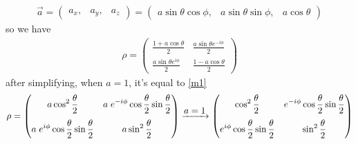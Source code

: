 \documentclass{article}
\begin{document}
\begin{align*}
    \vec{a} = 
    \begin{pmatrix}
        a_x,& a_y,& a_z 
    \end{pmatrix}
    = 
    \begin{pmatrix}
         a \sin\theta\cos\phi,& a \sin\theta\sin\phi,& a \cos\theta    
    \end{pmatrix}
\end{align*}
so we have
\begin{align*}
    \rho = \begin{pmatrix}\displaystyle \frac{1+a \cos\theta}{2}&\displaystyle \frac{a \sin\theta e^{-i\phi}}{2}\\[1em]\displaystyle \frac{a \sin\theta e^{i\phi}}{2}&\displaystyle \frac{1-a \cos\theta}{2}\end{pmatrix}
\end{align*}
after simplifying, when $a=1$, it's equal to \ref{m1}
\begin{align*}
    \rho = \begin{pmatrix}\displaystyle a \cos^2\frac{\theta}{2}&\displaystyle a \hspace{0.1cm} e^{-i\phi}\cos\frac{\theta}{2}\sin\frac{\theta}{2}\\[1em]\displaystyle a\hspace{0.1cm} e^{i\phi}\cos\frac{\theta}{2}\sin\frac{\theta}{2}&\displaystyle a \sin^2\frac{\theta}{2}\end{pmatrix}
    \xrightarrow{\displaystyle a = 1}
    \begin{pmatrix}\displaystyle\cos^2\frac{\theta}{2}&\displaystyle e^{-i\phi}\cos\frac{\theta}{2}\sin\frac{\theta}{2}\\[1em]\displaystyle e^{i\phi}\cos\frac{\theta}{2}\sin\frac{\theta}{2}&\displaystyle \sin^2\frac{\theta}{2}\end{pmatrix}
\end{align*}
\end{document}
